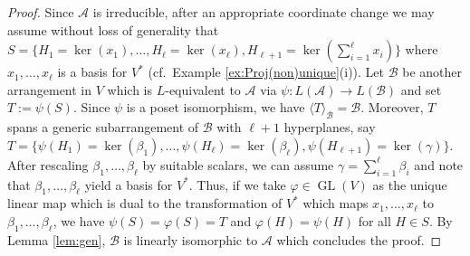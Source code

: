 \documentclass[10pt,a4paper]{amsart}
\newcommand\CA{{\mathscr A}}
\newcommand\CB{{\mathscr B}}
\newcommand\GL{\operatorname{GL}}
\begin{document}
\begin{proof}
	Since $\CA$ is irreducible, after an appropriate coordinate change we may assume without loss of generality that $S = \{H_1=\ker(x_1),\ldots,H_\ell = \ker(x_\ell),H_{\ell+1}=\ker(\sum_{i=1}^\ell x_i)\}$
	where $x_1,\ldots,x_\ell$ is a basis for $V^*$ (cf.\ Example \ref{ex:Proj(non)unique}(i)).
	Let $\CB$ be another arrangement in $V$ which is $L$-equivalent to $\CA$ via $\psi:L(\CA)\to L(\CB)$ and set $T := \psi(S)$.
	Since $\psi$ is a poset isomorphism, we have $\langle T \rangle_\CB = \CB$.
	Moreover, $T$ spans a generic subarrangement of $\CB$ with $\ell+1$ hyperplanes, 
	say $T = \{\psi(H_1)= \ker(\beta_1),\ldots,\psi(H_\ell) = \ker(\beta_\ell),\psi(H_{\ell+1}) = \ker(\gamma)\}$.
	After rescaling $\beta_1,\ldots,\beta_\ell$ by suitable scalars, we can assume $\gamma=\sum_{i=1}^\ell\beta_i$
	and note that $\beta_1,\ldots,\beta_\ell$ yield a basis for $V^*$. Thus, if we take $\varphi \in \GL(V)$ 
	as the unique linear map which is dual to the transformation of $V^*$ which maps $x_1,\ldots,x_\ell$ to $\beta_1,\ldots,\beta_\ell$,
	we have $\psi(S) = \varphi(S) = T$ and $\varphi(H) = \psi(H)$ for all $H\in S$. 
	By Lemma \ref{lem:gen}, $\CB$ is linearly isomorphic to $\CA$ which concludes the proof.
\end{proof}
\end{document}
